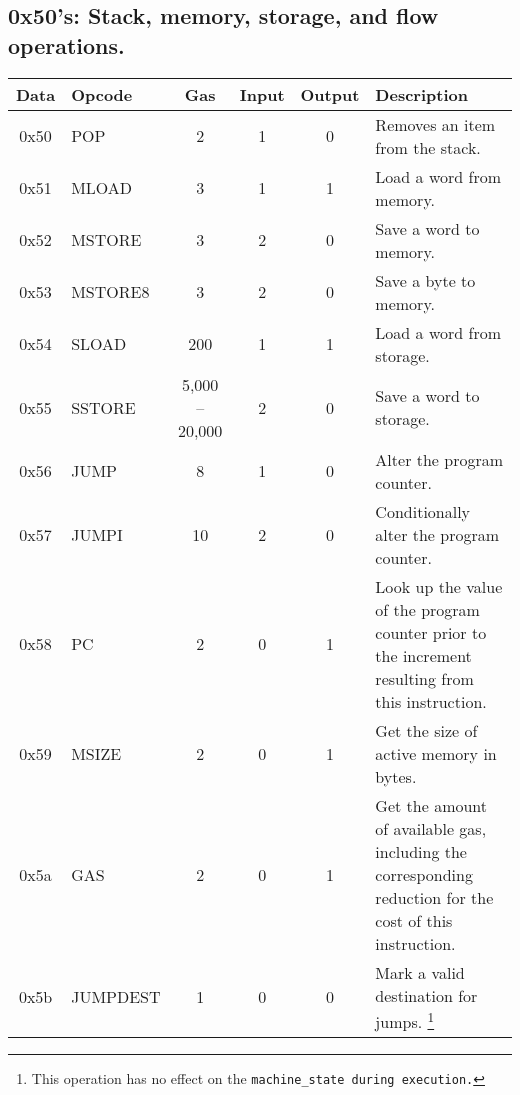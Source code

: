 \documentclass[10pt,letterpaper,leqno,bibliography=totoc]{scrartcl}
\newenvironment{alphafootnotes}
{\par\edef\savedfootnotenumber{\number\value{footnote}}
\renewcommand{\thefootnote}{\alph{footnote}}
\setcounter{footnote}{0}}
{\par\setcounter{footnote}{\savedfootnotenumber}}
\begin{document}
\begin{alphafootnotes}
		\subsection{0x50's: Stack, memory, storage, and flow operations.}
			\begin{longtable}{|cP{2.8cm}cccp{6cm}|}
			\hline
			\textbf{Data} & \textbf{Opcode} & \textbf{Gas}  & \textbf{Input}  & \textbf{Output} & \textbf{Description} \\
			\hline
			0x50 & POP & 2 & 1 & 0 & Removes an item from the stack. \\
			0x51 & MLOAD & 3 & 1 & 1 & Load a word from memory. \\
			0x52 & MSTORE & 3 & 2 & 0 & Save a word to memory. \\
			0x53 & MSTORE8 & 3 & 2 & 0 & Save a byte to memory. \\
			0x54 & SLOAD & 200 & 1 & 1 & Load a word from storage. \\
			0x55 & SSTORE & 5,000 -- 20,000 & 2 & 0 & Save a word to storage.\\
			0x56 & JUMP & 8 & 1 & 0 & Alter the program counter. \\
			0x57 & JUMPI & 10 & 2 & 0 & Conditionally alter the program counter. \\
			0x58 & PC & 2 & 0 & 1 & Look up the value of the program counter prior to the increment resulting from this instruction. \\
			0x59 & MSIZE & 2 & 0 & 1 & Get the size of active memory in bytes. \\
			0x5a & GAS & 2 & 0 & 1 & Get the amount of available gas, including the corresponding reduction for the cost of this instruction. \\
			0x5b & JUMPDEST & 1 & 0 & 0 & Mark a valid destination for jumps. \footnote{This operation has no effect on the \texttt{machine\_state during execution.}} \\
			\hline
			\end{longtable}


\end{alphafootnotes}
\end{document}
